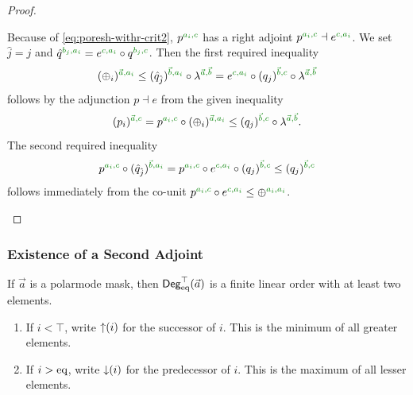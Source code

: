 \documentclass[a4paper]{memoir}
\begin{document}
\begin{proof}
\begin{enumerate}
\begin{itemize}
\begin{itemize}
				Because of \cref{eq:poresh-withr-crit2}, $p\pmrhom{a_i}{c}$ has a right adjoint $p\pmrhom{a_i}{c} \dashv e\pmrhom{c}{a_i}$.
				We set $\hat j = j$ and $\hat q\pmrhom{b_j}{a_i} = e\pmrhom{c}{a_i} \circ q\pmrhom{b_j}{c}$.
				Then the first required inequality
				\[
					(\pospol_i)\pmrhom{\vec a}{a_i}
					\leq
					(\hat q_{\hat j})\pmrhom{\vec b}{a_i} \circ \lambda \pmrhom{\vec a}{\vec b}
					=
					e\pmrhom{c}{a_i} \circ (q_j)\pmrhom{\vec b}{c} \circ \lambda \pmrhom{\vec a}{\vec b}
				\]
				follows by the adjunction $p \dashv e$ from the given inequality
				\[
					(p_i)\pmrhom{\vec a}{c} = p\pmrhom{a_i}{c} \circ (\pospol_i)\pmrhom{\vec a}{a_i}
					\leq
					(q_j)\pmrhom{\vec b}{c} \circ \lambda \pmrhom{\vec a}{\vec b}.
				\]
				The second required inequality
				\[
					p\pmrhom{a_i}{c} \circ (\hat q_{\hat j})\pmrhom{\vec b}{a_i} = p\pmrhom{a_i}{c} \circ e\pmrhom{c}{a_i} \circ (q_j)\pmrhom{\vec b}{c} \leq (q_j)\pmrhom{\vec b}{c}
				\]
				follows immediately from the co-unit $p\pmrhom{a_i}{c} \circ e\pmrhom{c}{a_i} \leq \pospol\pmrhom{a_i}{a_i}$. \qedhere
			\end{itemize}
		\end{itemize}
	\end{enumerate}
\end{proof}

\subsubsection{Existence of a Second Adjoint}
\begin{definition} \label{def:suc-degree}
	If $\vec a$ is a polarmode mask, then ${\mathsf{Deg}_{\mathrm{eq}}^\top}(\vec a)$ is a finite linear order with at least two elements.
	\begin{enumerate}
		\item If $i < \top$, write ${\uparrow}(i)$ for the successor of $i$. This is the minimum of all greater elements.
		\item If $i > {\mathrm{eq}}$, write ${\downarrow}(i)$ for the predecessor of $i$.
		This is the maximum of all lesser elements.
	\end{enumerate}
\end{definition}
\end{document}
